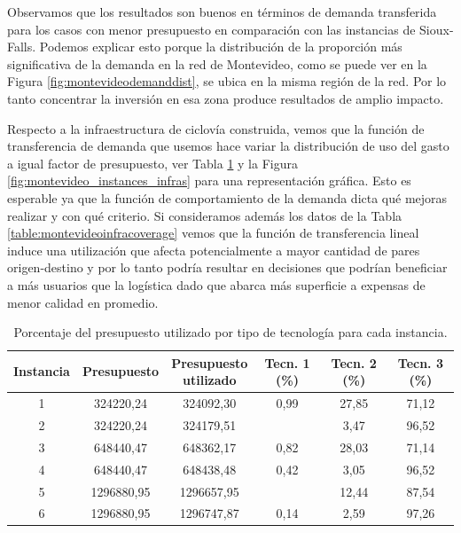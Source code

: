 \documentclass{article}
\begin{document}
  Observamos que los resultados son buenos en términos de demanda transferida para los casos con menor presupuesto en comparación con las instancias de Sioux-Falls. Podemos explicar esto porque la distribución de la proporción más significativa de la demanda en la red de Montevideo, como se puede ver en la Figura \ref{fig:montevideodemanddist}, se ubica en la misma región de la red. Por lo tanto concentrar la inversión en esa zona produce resultados de amplio impacto.

  Respecto a la infraestructura de ciclovía construida, vemos que la función de transferencia de demanda que usemos hace variar la distribución de uso del gasto a igual factor de presupuesto, ver Tabla \ref{table:montevideobudgetusage} y la Figura \ref{fig:montevideo_instances_infras} para una representación gráfica. Esto es esperable ya que la función de comportamiento de la demanda dicta qué mejoras realizar y con qué criterio. Si consideramos además los datos de la Tabla \ref{table:montevideoinfracoverage} vemos que la función de transferencia lineal induce una utilización que afecta potencialmente a mayor cantidad de pares origen-destino y por lo tanto podría resultar en decisiones que podrían beneficiar a más usuarios que la logística dado que abarca más superficie a expensas de menor calidad en promedio.

  \begin{table}[h!]
    \centering
    \begin{tabular}{cccccc}
      \toprule
        Instancia & Presupuesto & \shortstack{Presupuesto \\ utilizado} & Tecn. 1 (\%) & Tecn. 2 (\%) & Tecn. 3 (\%) \\
      \midrule
        1 & 324220,24 & 324092,30 & 0,99 & 27,85 & 71,12 \\
        2 & 324220,24 & 324179,51 &  & 3,47 & 96,52 \\
        3 & 648440,47 & 648362,17 & 0,82 & 28,03 & 71,14 \\
        4 & 648440,47 & 648438,48 & 0,42 & 3,05 & 96,52 \\
        5 & 1296880,95 & 1296657,95 &  & 12,44 & 87,54 \\
        6 & 1296880,95 & 1296747,87 & 0,14 & 2,59 & 97,26 \\
      \bottomrule
    \end{tabular}
    \caption{Porcentaje del presupuesto utilizado por tipo de tecnología para cada instancia.}\label{table:montevideobudgetusage}
  \end{table}
\end{document}
